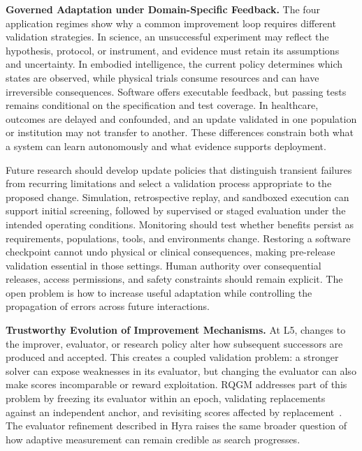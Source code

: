 \noindent\textbf{Governed Adaptation under Domain-Specific Feedback.}
The four application regimes show why a common improvement loop requires different validation strategies. In science, an unsuccessful experiment may reflect the hypothesis, protocol, or instrument, and evidence must retain its assumptions and uncertainty. In embodied intelligence, the current policy determines which states are observed, while physical trials consume resources and can have irreversible consequences. Software offers executable feedback, but passing tests remains conditional on the specification and test coverage. In healthcare, outcomes are delayed and confounded, and an update validated in one population or institution may not transfer to another. These differences constrain both what a system can learn autonomously and what evidence supports deployment.

Future research should develop update policies that distinguish transient failures from recurring limitations and select a validation process appropriate to the proposed change. Simulation, retrospective replay, and sandboxed execution can support initial screening, followed by supervised or staged evaluation under the intended operating conditions. Monitoring should test whether benefits persist as requirements, populations, tools, and environments change. Restoring a software checkpoint cannot undo physical or clinical consequences, making pre-release validation essential in those settings. Human authority over consequential releases, access permissions, and safety constraints should remain explicit. The open problem is how to increase useful adaptation while controlling the propagation of errors across future interactions.

\noindent\textbf{Trustworthy Evolution of Improvement Mechanisms.}
At L5, changes to the improver, evaluator, or research policy alter how subsequent successors are produced and accepted. This creates a coupled validation problem: a stronger solver can expose weaknesses in its evaluator, but changing the evaluator can also make scores incomparable or reward exploitation. RQGM addresses part of this problem by freezing its evaluator within an epoch, validating replacements against an independent anchor, and revisiting scores affected by replacement~\cite{iacob2026redqueen}. The evaluator refinement described in Hyra raises the same broader question of how adaptive measurement can remain credible as search progresses.

